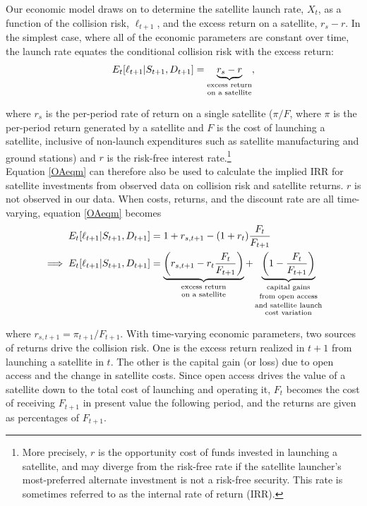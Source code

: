 \documentclass[12pt]{article}
\begin{document}
Our economic model draws on \cite{raorondinaWP} to determine the satellite launch rate, $X_t$, as a function of the collision risk, $\ell_{t+1}$, and the excess return on a satellite, $r_{s} - r$. In the simplest case, where all of the economic parameters are constant over time, the launch rate equates the conditional collision risk with the excess return:
\begin{equation}
\label{OAeqm}
E_t[\ell_{t+1}|S_{t+1},D_{t+1}] = \underbrace{r_s - r}_{\text{\shortstack{excess return\\on a satellite}}},
\end{equation}

where $r_s$ is the per-period rate of return on a single satellite ($\pi/F$, where $\pi$ is the per-period return generated by a satellite and $F$ is the cost of launching a satellite, inclusive of non-launch expenditures such as satellite manufacturing and ground stations) and $r$ is the risk-free interest rate.\footnote{More precisely, $r$ is the opportunity cost of funds invested in launching a satellite, and may diverge from the risk-free rate if the satellite launcher's most-preferred alternate investment is not a risk-free security. This rate is sometimes referred to as the internal rate of return (IRR).} \\

Equation \ref{OAeqm} can therefore also be used to calculate the implied IRR for satellite investments from observed data on collision risk and satellite returns. $r$ is not observed in our data. When costs, returns, and the discount rate are all time-varying, equation \ref{OAeqm} becomes
\begin{align}
\label{OAeqm2}
E_t[\ell_{t+1}|S_{t+1},D_{t+1}] &= 1+ r_{s,t+1} - (1+r_t) \frac{F_t}{F_{t+1}} \\
\implies E_t[\ell_{t+1}|S_{t+1},D_{t+1}] &= \underbrace{\left( r_{s,t+1} - r_t \frac{F_t}{F_{t+1}} \right)}_{\text{\shortstack{excess return\\on a satellite}}} + \underbrace{\left(1 - \frac{F_t}{F_{t+1}} \right)}_{\text{\shortstack{capital gains\\from open access\\and satellite launch\\cost variation}}} 
\end{align}

where $r_{s,t+1} = \pi_{t+1}/F_{t+1}$. With time-varying economic parameters, two sources of returns drive the collision risk. One is the excess return realized in $t+1$ from launching a satellite in $t$. The other is the capital gain (or loss) due to open access and the change in satellite costs. Since open access drives the value of a satellite down to the total cost of launching and operating it, $F_t$ becomes the cost of receiving $F_{t+1}$ in present value the following period, and the returns are given as percentages of $F_{t+1}$. 
\end{document}
